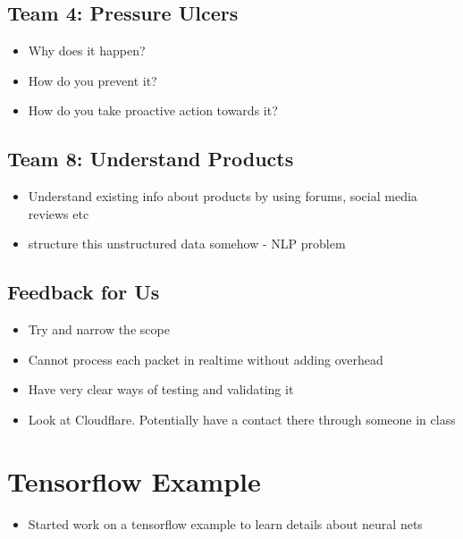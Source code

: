        \subsection{Team 4: Pressure Ulcers}
    \begin{itemize}
    		\item Why does it happen?
    		\item How do you prevent it?
    		\item How do you take proactive action towards it?
    \end{itemize}
    
        \subsection{Team 8: Understand Products}
    \begin{itemize}
    		\item Understand existing info about products by using forums, social media reviews etc
    		\item structure this unstructured data somehow - NLP problem
    \end{itemize}
    
    \subsection{Feedback for Us}
    \begin{itemize}
    		\item Try and narrow the scope
    		\item Cannot process each packet in realtime without adding overhead
    		\item Have very clear ways of testing and validating it
    		\item Look at Cloudflare. Potentially have a contact there through someone in class
    \end{itemize}
    
    \section{Tensorflow Example}
    \begin{itemize}
    		\item Started work on a tensorflow example to learn details about neural nets
    \end{itemize}
    
    
    